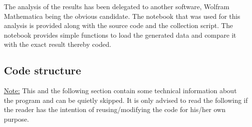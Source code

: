 \documentclass[11pt]{article}
\begin{document}
The analysis of the results has been delegated to another software, Wolfram Mathematica being the obvious candidate. The notebook that was used for this analysis is provided along with the source code and the collection script.
The notebook provides simple functions to load the generated data and compare it with the exact result thereby coded.



\subsection*{Code structure}

\underline{Note:} This and the following section contain some technical information about the program and can be quietly skipped. It is only advised to read the following if the reader has the intention of reusing/modifying the code for his/her own purpose.
\end{document}
